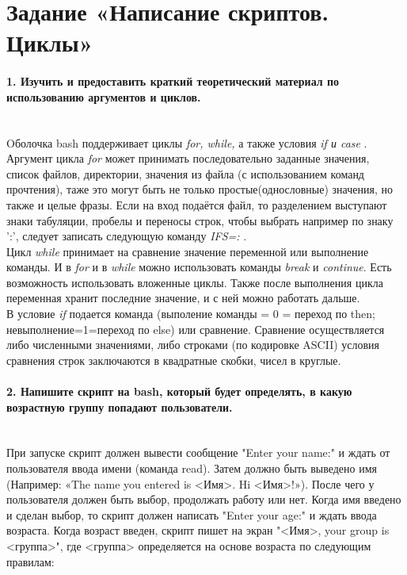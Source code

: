 \newpage
	\section*{Задание  «Написание скриптов. Циклы»}
	\paragraph*{ 1. Изучить и предоставить краткий теоретический материал по 				использованию аргументов и циклов. \\ \\}

Oболочка bash поддерживает циклы \textit{for, while,}  а также условия \textit{if и case} .\\ 
	
Аргумент цикла \textit{for} может принимать последовательно заданные значения, список файлов, директории, значения из файла (с использованием команд прочтения), таже это могут быть не только простые(однословные) значения, но также и целые фразы. Если на вход подаётся файл, то разделением выступают знаки табуляции, пробелы и переносы строк, чтобы выбрать например по знаку ':', следует записать следующую команду \textit{IFS=:} .\\

Цикл \textit{while} принимает на сравнение значение переменной или выполнение команды. И в \textit{for} и в \textit{while} можно использовать команды \textit{break} и \textit{continue}. Есть возможность использовать вложенные циклы. Также после выполнения цикла переменная хранит последние значение, и с ней можно работать дальше.  \\

В условие \textit{if} подается команда (выполение команды = 0 = переход по then; невыполнение=1=переход по else) или сравнение. Сравнение осуществляется либо численными значениями, либо строками (по кодировке ASCII) условия сравнения строк заключаются в квадратные скобки, чисел в круглые. \\

	\paragraph*{2. Напишите скрипт на bash, который будет определять, в какую возрастную группу попадают пользователи. \\ \\}
	
При запуске скрипт должен вывести сообщение "Enter your name:" и ждать от пользователя ввода имени (команда read). Затем должно быть выведено имя (Например: «The name you entered is <Имя>. Hi <Имя>!»). После чего у пользователя должен быть выбор, продолжать работу или нет. Когда имя введено и сделан выбор, то скрипт должен написать "Enter your age:" и ждать ввода возраста. Когда возраст введен, скрипт пишет на экран "<Имя>, your group is <группа>", где <группа> определяется на основе возраста по следующим правилам: \\

